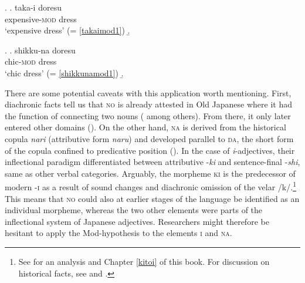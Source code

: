 \documentclass [output=book,colorlinks,citecolor=brown]{langscibook}
\begin{document}
\newpage

\ex. \label{takaimod2} \ag. taka-i doresu\\
expensive-\textsc{mod} dress \\
`expensive dress’ \null \hfill (= \ref{takaimod1})
\b. 

\ex. \label{shikkunamod2} \ag. shikku-na doresu\\
chic-\textsc{mod} dress\\
`chic dress’ \null \hfill (= \ref{shikkunamod1})
\b. 

There are some potential caveats with this application worth mentioning. First, diachronic facts tell us that \textsc{no} is already attested in Old Japanese where it had the function of connecting two nouns (\citealt{frellesvig:2010:history} among others). From there, it only later entered other domains (\citealt{sakurai:1964:meiyo, wenck:1974:systematische}). On the other hand, \textsc{na} is derived from the historical copula \textit{nari} (attributive form \textit{naru}) and developed parallel to \textsc{da}, the short form of the copula confined to predicative position (\citealt{kubo:1992:japanese, urushibara:1993:syntactic, nishiyama:1999:adj, miyama:2011:da}). In the case of \textit{i}-adjectives, their inflectional paradigm differentiated between attributive -\textit{ki} and sentence-final -\textit{shi}, same as other verbal categories. Arguably, the morpheme \textsc{ki} is the predecessor of modern -\textsc{i} as a result of sound changes and diachronic omission of the velar /k/.\footnote{See for an analysis \citet[sec. 3.3]{nishiyama:1999:adj} and Chapter \ref{kitoi} of this book. For discussion on historical facts, see \citet{urushibara:1993:syntactic} and \citet{frellesvig:2010:history}.} This means that \textsc{no} could also at earlier stages of the language be identified as an individual morpheme, whereas the two other elements were parts of the inflectional system of Japanese adjectives. Researchers might therefore be hesitant to apply the Mod-hypothesis to the elements \textsc{i} and \textsc{na}.
\end{document}
